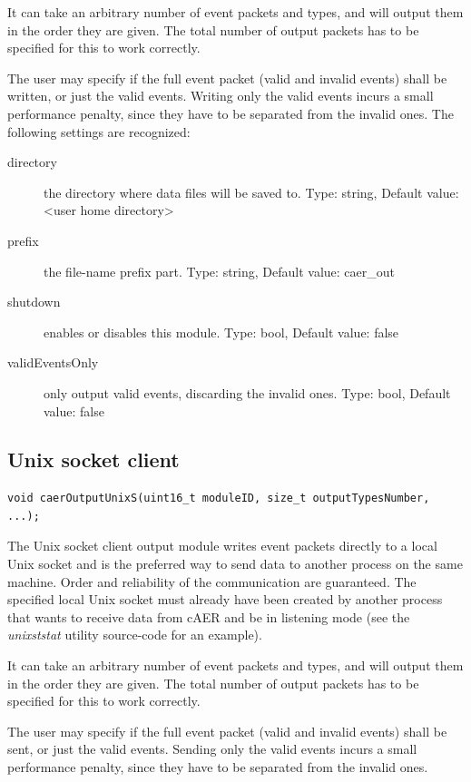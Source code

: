 \documentclass[a4paper,12pt]{report}
\begin{document}
It can take an arbitrary number of event packets and types, and will output them in the order they are given. The total number of output packets has to be specified for this to work correctly.

The user may specify if the full event packet (valid and invalid events) shall be written, or just the valid events. Writing only the valid events incurs a small performance penalty, since they have to be separated from the invalid ones.
\clearpage
The following settings are recognized:
\begin{description}
\item[directory] the directory where data files will be saved to.
\subitem Type: string, Default value: <user home directory>
\item[prefix] the file-name prefix part.
\subitem Type: string, Default value: caer\_out
\item[shutdown] enables or disables this module.
\subitem Type: bool, Default value: false
\item[validEventsOnly] only output valid events, discarding the invalid ones.
\subitem Type: bool, Default value: false
\end{description}

\subsection{Unix socket client} \label{subsec:unix_socket_client}

\begin{lstlisting}
void caerOutputUnixS(uint16_t moduleID, size_t outputTypesNumber, ...);
\end{lstlisting}

The Unix socket client output module writes event packets directly to a local Unix socket and is the preferred way to send data to another process on the same machine. Order and reliability of the communication are guaranteed.
The specified local Unix socket must already have been created by another process that wants to receive data from cAER and be in listening mode (see the \emph{unixststat} utility source-code for an example).

It can take an arbitrary number of event packets and types, and will output them in the order they are given. The total number of output packets has to be specified for this to work correctly.

The user may specify if the full event packet (valid and invalid events) shall be sent, or just the valid events. Sending only the valid events incurs a small performance penalty, since they have to be separated from the invalid ones.
\end{document}

